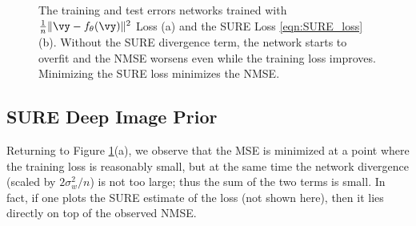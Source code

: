 \documentclass{article}
\begin{document}
\begin{figure}[t]
\centering
{}
\caption{ The training and test errors networks trained with $\frac{1}{n}\|\vy-f_\theta(\vy)\|^2$ Loss (a) and the SURE Loss \eqref{eqn:SURE_loss} (b). Without the SURE divergence term, the network starts to overfit and the NMSE worsens even while the training loss improves. Minimizing the SURE loss minimizes the NMSE.}
\label{fig:ReconErrs}
\end{figure}\subsection{SURE Deep Image Prior}

Returning to Figure \ref{fig:ReconErrs}(a), we observe that the MSE is minimized at a point where  the training loss is reasonably small, but at the same time the network divergence (scaled by $2\sigma_w^2/n$) is not too large; thus the sum of the two terms is small. 
In fact, if one plots the SURE estimate of the loss (not shown here), then it lies directly on top of the observed NMSE.
\end{document}
